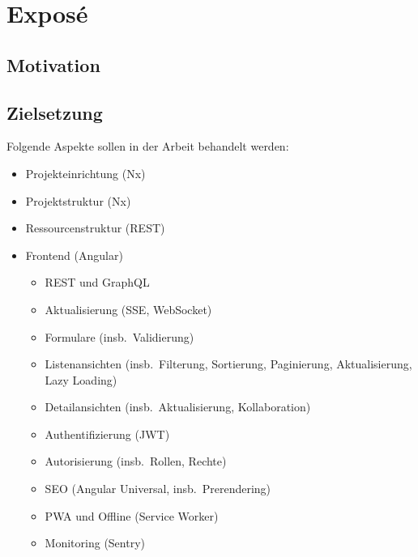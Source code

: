 \chapter{Exposé}\label{ch:expose}

\section{Motivation}\label{sec:motivation}

\section{Zielsetzung}\label{sec:zielsetzung}

Folgende Aspekte sollen in der Arbeit behandelt werden:

\begin{itemize}
    \item Projekteinrichtung (Nx)
    \item Projektstruktur (Nx)
    \item Ressourcenstruktur (REST)
    \item Frontend (Angular)
    \begin{itemize}
        \item REST und GraphQL
        \item Aktualisierung (SSE, WebSocket)
        \item Formulare (insb.\ Validierung)
        \item Listenansichten (insb.\ Filterung, Sortierung, Paginierung, Aktualisierung, Lazy Loading)
        \item Detailansichten (insb.\ Aktualisierung, Kollaboration)
        \item Authentifizierung (JWT)
        \item Autorisierung (insb.\ Rollen, Rechte)
        \item SEO (Angular Universal, insb.\ Prerendering)
        \item PWA und Offline (Service Worker)
        \item Monitoring (Sentry)

\end{itemize}
\end{itemize}
